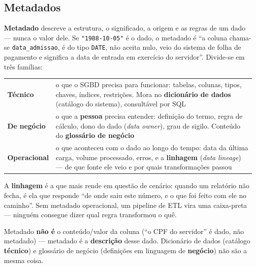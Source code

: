 \subsection{Metadados}

\begin{conceito}
\textbf{Metadado} descreve a estrutura, o significado, a origem e as
regras de um dado --- nunca o valor dele. Se \texttt{"1988-10-05"} é o
dado, o metadado é “a coluna chama-se \texttt{data\_admissao}, é do tipo
\texttt{DATE}, não aceita nulo, veio do sistema de folha de pagamento e
significa a data de entrada em exercício do servidor”. Divide-se em três
famílias:

\begin{center}
\begin{tabular}{@{}p{2.6cm}p{9cm}@{}}
\toprule
\textbf{Técnico} & o que o SGBD precisa para funcionar: tabelas, colunas,
tipos, chaves, índices, restrições. Mora no \textbf{dicionário de dados}
(catálogo do sistema), consultável por SQL \\
\textbf{De negócio} & o que a \textbf{pessoa} precisa entender: definição
do termo, regra de cálculo, dono do dado (\textit{data owner}), grau de
sigilo. Conteúdo do \textbf{glossário de negócio} \\
\textbf{Operacional} & o que aconteceu com o dado ao longo do tempo: data
da última carga, volume processado, erros, e a \textbf{linhagem}
(\textit{data lineage}) --- de que fonte ele veio e por quais
transformações passou \\
\bottomrule
\end{tabular}
\end{center}

A \textbf{linhagem} é a que mais rende em questão de cenário: quando um
relatório não fecha, é ela que responde “de onde saiu este número, e o que
foi feito com ele no caminho”. Sem metadado operacional, um pipeline de
ETL vira uma caixa-preta --- ninguém consegue dizer qual regra transformou
o quê.
\end{conceito}

\begin{cuidado}
Metadado \textbf{não é} o conteúdo/valor da coluna (“o CPF do servidor” é
dado, não metadado) --- metadado é a \textbf{descrição} desse dado.
Dicionário de dados (catálogo \textbf{técnico}) e glossário de negócio
(definições em linguagem de \textbf{negócio}) não são a mesma coisa.
\end{cuidado}


